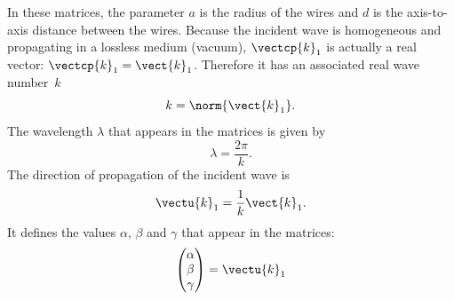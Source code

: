 \begin{refsection}
In these matrices, the parameter $a$ is the radius of the wires
and $d$ is the axis-to-axis distance between the wires.
Because the incident wave is homogeneous and propagating in a lossless medium (vacuum), $\vectcp{k}_1$ is actually a real vector: $\vectcp{k}_1 = \vect{k}_1$.
Therefore it has an associated real wave number~$k$
\begin{equation}
    k = \norm{\vect{k}_1}\text{.}
\end{equation}
The wavelength $\lambda$ that appears in the matrices is given by
\begin{equation}
    \lambda = \frac{2 \pi}{k}
    \text{.}
\end{equation}
The direction of propagation of the incident wave is
\begin{equation}
    \vectu{k}_1 = \frac{1}{k} \vect{k}_1
    \text{.}
\end{equation}
It defines the values $\alpha$, $\beta$ and $\gamma$ that appear in the matrices:
\begin{equation}
    \begin{pmatrix}
    \alpha \\ \beta \\ \gamma
    \end{pmatrix}
    =
    \vectu{k}_1
\end{equation}


\end{refsection}
